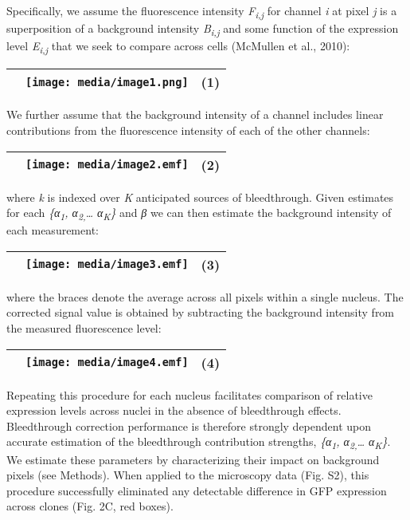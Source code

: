Specifically, we assume the fluorescence intensity \emph{F\textsubscript{i,j}} for channel \emph{i} at pixel \emph{j} is a superposition of a background intensity \emph{B\textsubscript{i,j}} and some function of the expression level \emph{E\textsubscript{i,j}} that we seek to compare across cells (McMullen et al., 2010):

\begin{longtable}[]{@{}lll@{}}
\toprule
& \texttt{[image: media/image1.png]} & (1)\tabularnewline
\bottomrule
\end{longtable}

We further assume that the background intensity of a channel includes linear contributions from the fluorescence intensity of each of the other channels:

\begin{longtable}[]{@{}lll@{}}
\toprule
& \texttt{[image: media/image2.emf]} & (2)\tabularnewline
\bottomrule
\end{longtable}

where \emph{k} is indexed over \emph{K} anticipated sources of bleedthrough. Given estimates for each \emph{\{α\textsubscript{1}, α\textsubscript{2,}\ldots{} α\textsubscript{K}\}} and \emph{β} we can then estimate the background intensity of each measurement:

\begin{longtable}[]{@{}lll@{}}
\toprule
& \texttt{[image: media/image3.emf]} & (\protect\hypertarget{GLM}{}{}3)\tabularnewline
\bottomrule
\end{longtable}

where the braces denote the average across all pixels within a single nucleus. The corrected signal value is obtained by subtracting the background intensity from the measured fluorescence level:

\begin{longtable}[]{@{}lll@{}}
\toprule
& \texttt{[image: media/image4.emf]} & (4)\tabularnewline
\bottomrule
\end{longtable}

Repeating this procedure for each nucleus facilitates comparison of relative expression levels across nuclei in the absence of bleedthrough effects. Bleedthrough correction performance is therefore strongly dependent upon accurate estimation of the bleedthrough contribution strengths, \emph{\{α\textsubscript{1}, α\textsubscript{2,}\ldots{} α\textsubscript{K}\}}. We estimate these parameters by characterizing their impact on background pixels (see Methods). When applied to the microscopy data (Fig. S2), this procedure successfully eliminated any detectable difference in GFP expression across clones (Fig. 2C, red boxes).

